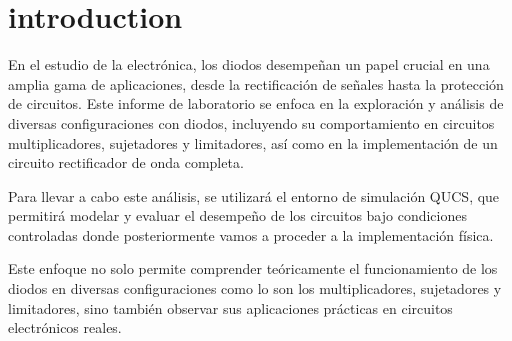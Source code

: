\section{introduction}
En el estudio de la electrónica, los diodos desempeñan un papel crucial en una amplia gama de aplicaciones, desde la rectificación de señales hasta la protección de circuitos. Este informe de laboratorio se enfoca en la exploración y análisis de diversas configuraciones con diodos, incluyendo su comportamiento en circuitos multiplicadores, sujetadores y limitadores, así como en la implementación de un circuito rectificador de onda completa.

Para llevar a cabo este análisis, se utilizará el entorno de simulación QUCS, que permitirá modelar y evaluar el desempeño de los circuitos bajo condiciones controladas donde posteriormente vamos a proceder a la implementación física. 

Este enfoque no solo permite comprender teóricamente el funcionamiento de los diodos en diversas configuraciones como lo son los multiplicadores, sujetadores y limitadores, sino también observar sus aplicaciones prácticas en circuitos electrónicos reales.
